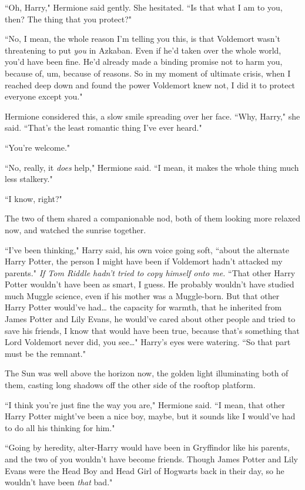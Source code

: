 ``Oh, Harry," Hermione said gently. She hesitated. ``Is that what I am to you, then? The thing that you protect?"

``No, I mean, the whole reason I'm telling you this, is that Voldemort wasn't threatening to put \emph{you} in Azkaban. Even if he'd taken over the whole world, you'd have been fine. He'd already made a binding promise not to harm you, because of, um, because of reasons. So in my moment of ultimate crisis, when I reached deep down and found the power Voldemort knew not, I did it to protect everyone except you."

Hermione considered this, a slow smile spreading over her face. ``Why, Harry," she said. ``That's the least romantic thing I've ever heard."

``You're welcome."

``No, really, it \emph{does} help," Hermione said. ``I mean, it makes the whole thing much less stalkery."

``I know, right?"

The two of them shared a companionable nod, both of them looking more relaxed now, and watched the sunrise together.

``I've been thinking," Harry said, his own voice going soft, ``about the alternate Harry Potter, the person I might have been if Voldemort hadn't attacked my parents." \emph{If Tom Riddle hadn't tried to copy himself onto me.} ``That other Harry Potter wouldn't have been as smart, I guess. He probably wouldn't have studied much Muggle science, even if his mother was a Muggle-born. But that other Harry Potter would've had{\ldots} the capacity for warmth, that he inherited from James Potter and Lily Evans, he would've cared about other people and tried to save his friends, I know that would have been true, because that's something that Lord Voldemort never did, you see{\ldots}" Harry's eyes were watering. ``So that part must be the remnant."

The Sun was well above the horizon now, the golden light illuminating both of them, casting long shadows off the other side of the rooftop platform.

``I think you're just fine the way you are," Hermione said. ``I mean, that other Harry Potter might've been a nice boy, maybe, but it sounds like I would've had to do all his thinking for him."

``Going by heredity, alter-Harry would have been in Gryffindor like his parents, and the two of you wouldn't have become friends. Though James Potter and Lily Evans were the Head Boy and Head Girl of Hogwarts back in their day, so he wouldn't have been \emph{that} bad."

